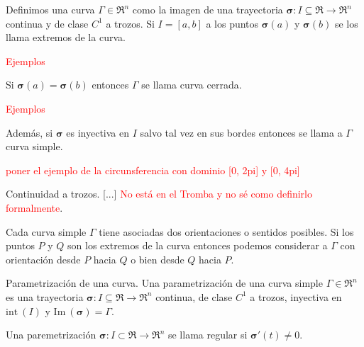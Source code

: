\begin{definition}
    Definimos una curva $\Gamma\in\Re^n$ como la imagen de una trayectoria $\boldsymbol{\sigma}:I\subseteq\Re\to\Re^n$ continua y de clase $C^1$ a trozos. Si $I=[a,b]$ a los puntos $\boldsymbol{\sigma}(a)$ y $\boldsymbol{\sigma}(b)$ se los llama extremos de la curva.\final

    \textcolor{red}{Ejemplos}

    Si $\boldsymbol{\sigma}(a)=\boldsymbol{\sigma}(b)$ entonces $\Gamma$ se llama curva cerrada.

    \textcolor{red}{Ejemplos}

    Adem\'as, si $\boldsymbol{\sigma}$ es inyectiva en $I$ salvo tal vez en sus bordes entonces se llama a $\Gamma$ curva simple.

    \textcolor{red}{poner el ejemplo de la circunsferencia con dominio [0, 2pi] y [0, 4pi]}
\end{definition}

\begin{definition}
    Continuidad a trozos. [...] \textcolor{red}{No est\'a en el Tromba y no s\'e como definirlo formalmente}.\final
\end{definition}

Cada curva simple $\Gamma$ tiene asociadas dos orientaciones o sentidos posibles. Si los puntos $P$ y $Q$ son los extremos de la curva entonces podemos considerar a $\Gamma$ con orientaci\'on desde $P$ hacia $Q$ o bien desde $Q$ hacia $P$.

\begin{definition}
    Parametrizaci\'on de una curva. Una parametrizaci\'on de una curva simple $\Gamma\in\Re^n$ es una trayectoria $\boldsymbol{\sigma}:I\subseteq\Re\to\Re^n$ continua, de clase $C^1$ a trozos, inyectiva en $\text{int}\:(I)$ y $\text{Im}\:(\boldsymbol{\sigma})=\Gamma$.\final
\end{definition}

\begin{definition}
    Una paremetrizaci\'on $\boldsymbol{\sigma}:I\subset\Re\to\Re^n$ se llama regular si $\boldsymbol{\sigma}'(t)\neq0$.\final
\end{definition}